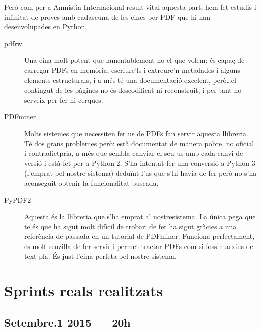 \documentclass{article}
\begin{document}
Però com per a Amnistia Internacional result vital aquesta part, hem fet estudis i infinitat de proves amb cadascuna de les eines per PDF que hi han desenvolupades en Python.


\begin{description}
    \item[pdfrw] Una eina molt potent que lamentablement no el que volem: és capaç de carregar PDFs en memòria, escriure'ls i extreure'n metadades i alguns elements estructurals, i a més té una documentació excelent, però\ldots el contingut de les pàgines no és descodificat ni reconstruit, i per tant no serveix per fer-hi cerques.
    \item[PDFminer] Molts sistemes que necessiten fer us de PDFs fan servir aquesta llibreria. Té dos grans problemes però: està documentat de manera pobre, no oficial i contradictpria, a més que sembla canviar el seu us amb cada canvi de versió i està fet per a Python 2. S'ha intentat fer una conversió a Python 3 (l'emprat pel nostre sistema) deduïnt l'us que s'hi havia de fer però no s'ha aconseguit obtenir la funcionalitat buscada.
    \item[PyPDF2] Aquesta és la llibreria que s'ha emprat al nostresistema. La única pega que te és que ha sigut molt difícil de trobar: de fet ha sigut gràcies a una referència de passada en un tutorial de PDFminer. Funciona perfectament, és molt senzilla de fer servir i permet tractar PDFs com si fossin arxius de text pla. És just l'eina perfeta pel nostre sistema.
\end{description}

\newpage

\section{Sprints reals realitzats}

\subsection{Setembre.1 2015 --- 20h}
\end{document}
